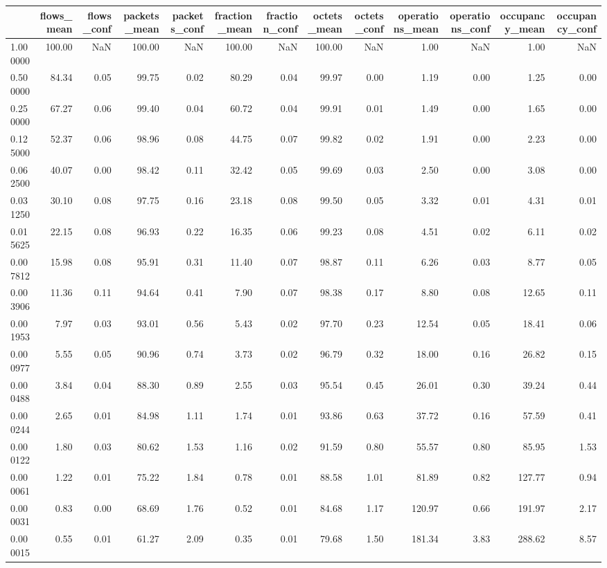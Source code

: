 \begin{tabular}{lrrrrrrrrrrrr}
\toprule
 & flows_mean & flows_conf & packets_mean & packets_conf & fraction_mean & fraction_conf & octets_mean & octets_conf & operations_mean & operations_conf & occupancy_mean & occupancy_conf \\
\midrule
1.000000 & 100.00 & NaN & 100.00 & NaN & 100.00 & NaN & 100.00 & NaN & 1.00 & NaN & 1.00 & NaN \\
0.500000 & 84.34 & 0.05 & 99.75 & 0.02 & 80.29 & 0.04 & 99.97 & 0.00 & 1.19 & 0.00 & 1.25 & 0.00 \\
0.250000 & 67.27 & 0.06 & 99.40 & 0.04 & 60.72 & 0.04 & 99.91 & 0.01 & 1.49 & 0.00 & 1.65 & 0.00 \\
0.125000 & 52.37 & 0.06 & 98.96 & 0.08 & 44.75 & 0.07 & 99.82 & 0.02 & 1.91 & 0.00 & 2.23 & 0.00 \\
0.062500 & 40.07 & 0.00 & 98.42 & 0.11 & 32.42 & 0.05 & 99.69 & 0.03 & 2.50 & 0.00 & 3.08 & 0.00 \\
0.031250 & 30.10 & 0.08 & 97.75 & 0.16 & 23.18 & 0.08 & 99.50 & 0.05 & 3.32 & 0.01 & 4.31 & 0.01 \\
0.015625 & 22.15 & 0.08 & 96.93 & 0.22 & 16.35 & 0.06 & 99.23 & 0.08 & 4.51 & 0.02 & 6.11 & 0.02 \\
0.007812 & 15.98 & 0.08 & 95.91 & 0.31 & 11.40 & 0.07 & 98.87 & 0.11 & 6.26 & 0.03 & 8.77 & 0.05 \\
0.003906 & 11.36 & 0.11 & 94.64 & 0.41 & 7.90 & 0.07 & 98.38 & 0.17 & 8.80 & 0.08 & 12.65 & 0.11 \\
0.001953 & 7.97 & 0.03 & 93.01 & 0.56 & 5.43 & 0.02 & 97.70 & 0.23 & 12.54 & 0.05 & 18.41 & 0.06 \\
0.000977 & 5.55 & 0.05 & 90.96 & 0.74 & 3.73 & 0.02 & 96.79 & 0.32 & 18.00 & 0.16 & 26.82 & 0.15 \\
0.000488 & 3.84 & 0.04 & 88.30 & 0.89 & 2.55 & 0.03 & 95.54 & 0.45 & 26.01 & 0.30 & 39.24 & 0.44 \\
0.000244 & 2.65 & 0.01 & 84.98 & 1.11 & 1.74 & 0.01 & 93.86 & 0.63 & 37.72 & 0.16 & 57.59 & 0.41 \\
0.000122 & 1.80 & 0.03 & 80.62 & 1.53 & 1.16 & 0.02 & 91.59 & 0.80 & 55.57 & 0.80 & 85.95 & 1.53 \\
0.000061 & 1.22 & 0.01 & 75.22 & 1.84 & 0.78 & 0.01 & 88.58 & 1.01 & 81.89 & 0.82 & 127.77 & 0.94 \\
0.000031 & 0.83 & 0.00 & 68.69 & 1.76 & 0.52 & 0.01 & 84.68 & 1.17 & 120.97 & 0.66 & 191.97 & 2.17 \\
0.000015 & 0.55 & 0.01 & 61.27 & 2.09 & 0.35 & 0.01 & 79.68 & 1.50 & 181.34 & 3.83 & 288.62 & 8.57 \\

\end{tabular}
